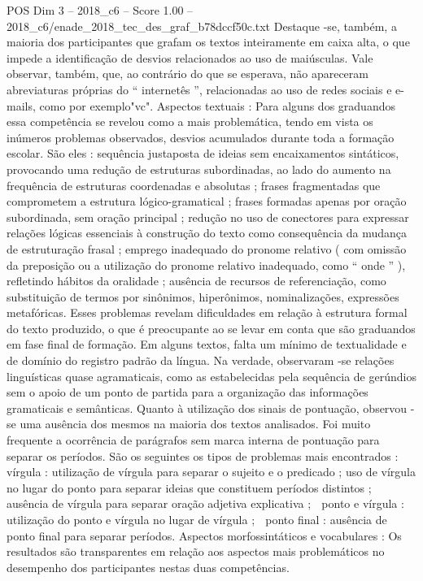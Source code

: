 \begin{textsample}{POS Dim 3 – 2018\_c6 – Score 1.00 – 2018\_c6/enade\_2018\_tec\_des\_graf\_b78dccf50c.txt}
Destaque -se, também, a maioria dos participantes que grafam os textos inteiramente em caixa alta, o que impede a identificação de desvios relacionados ao uso de maiúsculas.
Vale observar, também, que, ao contrário do que se esperava, não apareceram abreviaturas próprias do “ internetês ”, relacionadas ao uso de redes sociais e e-mails, como por exemplo"vc".
Aspectos textuais : Para alguns dos graduandos essa competência se revelou como a mais problemática, tendo em vista os inúmeros problemas observados, desvios acumulados durante toda a formação escolar.
São eles : sequência justaposta de ideias sem encaixamentos sintáticos, provocando uma redução de estruturas subordinadas, ao lado do aumento na frequência de estruturas coordenadas e absolutas ; frases fragmentadas que comprometem a estrutura lógico-gramatical ; frases formadas apenas por oração subordinada, sem oração principal ; redução no uso de conectores para expressar relações lógicas essenciais à construção do texto como consequência da mudança de estruturação frasal ; emprego inadequado do pronome relativo ( com omissão da preposição ou a utilização do pronome relativo inadequado, como “ onde ” ), refletindo hábitos da oralidade ; ausência de recursos de referenciação, como substituição de termos por sinônimos, hiperônimos, nominalizações, expressões metafóricas.
Esses problemas revelam dificuldades em relação à estrutura formal do texto produzido, o que é preocupante ao se levar em conta que são graduandos em fase final de formação.
Em alguns textos, falta um mínimo de textualidade e de domínio do registro padrão da língua.
Na verdade, observaram -se relações linguísticas quase agramaticais, como as estabelecidas pela sequência de gerúndios sem o apoio de um ponto de partida para a organização das informações gramaticais e semânticas.
Quanto à utilização dos sinais de pontuação, observou -se uma ausência dos mesmos na maioria dos textos analisados.
Foi muito frequente a ocorrência de parágrafos sem marca interna de pontuação para separar os períodos.
São os seguintes os tipos de problemas mais encontrados :  vírgula : utilização de vírgula para separar o sujeito e o predicado ; uso de vírgula no lugar do ponto para separar ideias que constituem períodos distintos ; ausência de vírgula para separar oração adjetiva explicativa ;  ponto e vírgula : utilização do ponto e vírgula no lugar de vírgula ;  ponto final : ausência de ponto final para separar períodos.
Aspectos morfossintáticos e vocabulares : Os resultados são transparentes em relação aos aspectos mais problemáticos no desempenho dos participantes nestas duas competências.

\end{textsample}
